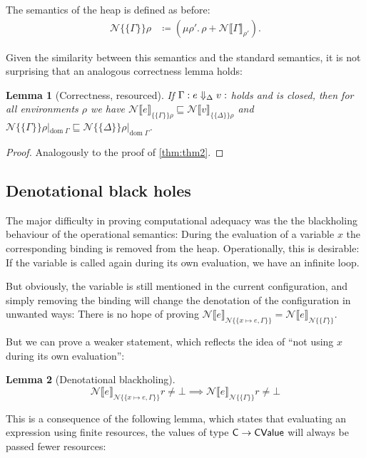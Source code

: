 \documentclass{jfp1}
\newtheorem{lemma}{Lemma}
\theoremstyle{nonumberbreak}
\newtheorem{proof}{Proof}
\newcommand{\sCValue}{\text{\textsf{CValue}}}
\newcommand{\sC}     {\text{\textsf{C}}}
\newcommand{\sred}[5]{#1 : #2 \Downarrow_{#3} #4 : #5}
\newcommand{\dom}[1]{\text{dom}\;#1}
\newcommand{\esem}[1]{\{\!\!\!\{#1\}\!\!\!\}}
\newcommand{\dsemr}[2]{\mathcal N\!\llbracket #1 \rrbracket_{#2}}
\newcommand{\esemr}[1]{\mathcal N\!\!\{\!\!\!\{#1\}\!\!\!\}}
\newcommand{\upd}[1]{\mathop{++_{#1}}}
\begin{document}
The semantics of the heap is defined as before:
\begin{align*}
\esemr{\Gamma}\rho &\coloneqq (\mu \rho'.\, \rho \upd{\dom \Gamma} \dsemr{\Gamma}{\rho'}).
\end{align*}

Given the similarity between this semantics and the standard semantics, it is not surprising that an analogous correctness lemma holds:

\begin{lemma}[Correctness, resourced]
If $\sred \Gamma e \Delta v$ holds and is closed, then for all environments $\rho$ we have $\dsemr{e}{\esem{\Gamma}{\rho}} \sqsubseteq \dsemr{v}{\esem{\Delta}{\rho}}$ and $\esemr\Gamma\rho|_{\dom\Gamma} \sqsubseteq \esemr\Delta\rho|_{\dom\Gamma}$.%
\label{lem:resourced_correctness}
\end{lemma}

\begin{proof}
Analogously to the proof of \autoref{thm:thm2}.
\end{proof}

\subsection{Denotational black holes}

The major difficulty in proving computational adequacy was the the blackholing behaviour of the operational semantics: During the evaluation of a variable $x$ the corresponding binding is removed from the heap. Operationally, this is desirable: If the variable is called again during its own evaluation, we have an infinite loop.

But obviously, the variable is still mentioned in the current configuration, and simply removing the binding will change the denotation of the configuration in unwanted ways: There is no hope of proving $\dsemr{e}{\esemr{x\mapsto e, \Gamma}} = \dsemr{e}{\esemr{\Gamma}}$.

But we can prove a weaker statement, which reflects the idea of ``not using $x$ during its own evaluation'':

\begin{lemma}[Denotational blackholing]
\label{lem:denblackhole}
\[
\dsemr{e}{\esemr{x\mapsto e, \Gamma}} r \ne \bot \implies \dsemr{e}{\esemr{\Gamma}} r \ne \bot
\]
\end{lemma}

This is a consequence of the following lemma, which states that evaluating an expression using finite resources, the values of type $\sC \to \sCValue$ will always be passed fewer resources:
\end{document}
